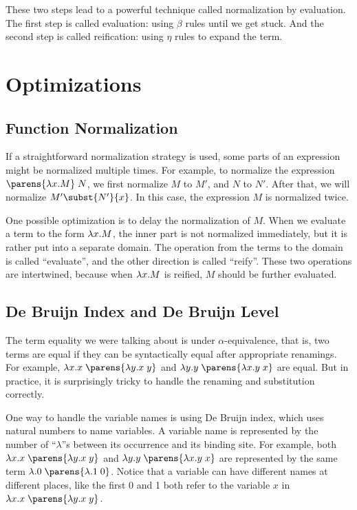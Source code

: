 \documentclass[11pt]{article}
\begin{document}
These two steps lead to a powerful technique called normalization by evaluation. The first step is called evaluation: using $\beta$ rules until we get stuck. And the second step is called reification: using $\eta$ rules to expand the term.

\section{Optimizations}

\subsection{Function Normalization}
If a straightforward normalization strategy is used, some parts of an expression might be normalized multiple times. For example, to normalize the expression $\app{\parens{\lam{x}{M}}}{N}$, we first normalize $M$ to $M'$, and $N$ to $N'$. After that, we will normalize $M'\subst{N'}{x}$. In this case, the expression $M$ is normalized twice.

One possible optimization is to delay the normalization of $M$. When we evaluate a term to the form $\lam{x}{M}$, the inner part is not normalized immediately, but it is rather put into a separate domain. The operation from the terms to the domain is called ``evaluate'', and the other direction is called ``reify''. These two operations are intertwined, because when $\lam{x}{M}$ is reified, $M$ should be further evaluated.

\subsection{De Bruijn Index and De Bruijn Level}
The term equality we were talking about is under $\alpha$-equivalence, that is, two terms are equal if they can be syntactically equal after appropriate renamings. For example, $\lam{x}{\app{x}{\parens{\lam{y}{\app{x}{y}}}}}$ and $\lam{y}{\app{y}{\parens{\lam{x}{\app{y}{x}}}}}$ are equal. But in practice, it is surprisingly tricky to handle the renaming and substitution correctly.

One way to handle the variable names is using De Bruijn index, which uses natural numbers to name variables. A variable name is represented by the number of ``$\lambda$''s between its occurrence and its binding site. For example, both $\lam{x}{\app{x}{\parens{\lam{y}{\app{x}{y}}}}}$ and $\lam{y}{\app{y}{\parens{\lam{x}{\app{y}{x}}}}}$ are represented by the same term $\lam{}{\app{0}{\parens{\lam{}{\app{1}{0}}}}}$. Notice that a variable can have different names at different places, like the first 0 and 1 both refer to the variable $x$ in
$\lam{x}{\app{x}{\parens{\lam{y}{\app{x}{y}}}}}$.
\end{document}
